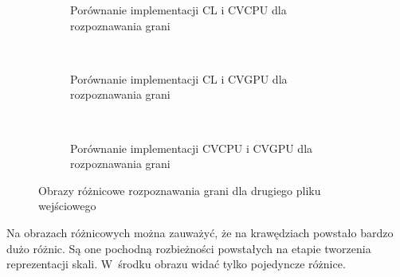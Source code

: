 \begin{figure}
\begin{subfigure}[t]{0.3\textwidth}
	\centering
	\setlength\fboxsep{0pt}
	\setlength\fboxrule{0.5pt}
	\caption{Porównanie implementacji CL i CVCPU dla rozpoznawania grani}
	\label{fig:valRidge4CLCVCPU}
\end{subfigure}
~
\begin{subfigure}[t]{0.3\textwidth}
	\centering
	\setlength\fboxsep{0pt}
	\setlength\fboxrule{0.5pt}
	\caption{Porównanie implementacji CL i CVGPU dla rozpoznawania grani}
	\label{fig:valRidge4CLCVGPU}
\end{subfigure}
~
\begin{subfigure}[t]{0.3\textwidth}
	\centering
	\setlength\fboxsep{0pt}
	\setlength\fboxrule{0.5pt}
	\caption{Porównanie implementacji CVCPU i CVGPU dla rozpoznawania grani}
	\label{fig:valRidge4CVCPUCVGPU}                 
\end{subfigure}
\caption{Obrazy różnicowe rozpoznawania grani dla drugiego pliku wejściowego}
\label{lena_scales}
\label{fig:valRidge4}
\end{figure}

Na obrazach różnicowych można zauważyć, że na krawędziach powstało bardzo dużo różnic. Są one pochodną rozbieżności powstałych na etapie tworzenia reprezentacji skali. W~środku obrazu widać tylko pojedyncze różnice. 
